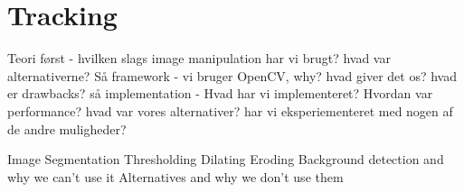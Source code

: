
\section{Tracking}

Teori først - hvilken slags image manipulation har vi brugt? hvad var alternativerne?
Så framework - vi bruger OpenCV, why? hvad giver det os? hvad er drawbacks?
så implementation - Hvad har vi implementeret? Hvordan var performance? hvad var vores alternativer? har vi eksperiementeret med nogen af de andre muligheder?

Image Segmentation
Thresholding
Dilating
Eroding
Background detection and why we can't use it
Alternatives and why we don't use them



